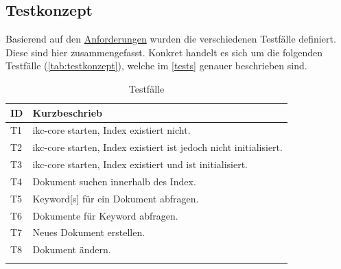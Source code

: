 \subsection{Testkonzept}
Basierend auf den \hyperref[anforderungen]{Anforderungen} wurden die verschiedenen Testfälle definiert. Diese sind hier zusammengefasst. Konkret handelt es sich um die folgenden Testfälle (\autoref{tab:testkonzept}), welche im \autoref{tests} genauer beschrieben sind.

\begin{longtable}{|p{1cm} | P{6cm} |}
  \hline
    ID & Kurzbeschrieb \\\hline
    T1 & \gls{ikc-core} starten, Index existiert nicht.\\\hline
    T2 & \gls{ikc-core} starten, Index existiert ist jedoch nicht initialisiert.\\\hline
    T3 & \gls{ikc-core} starten, Index existiert und ist initialisiert.\\\hline
    T4 & Dokument suchen innerhalb des Index.\\\hline
    T5 & \gls{Keyword}[s] für ein Dokument abfragen.\\\hline
    T6 & Dokumente für \gls{Keyword} abfragen.\\\hline
    T7 & Neues Dokument erstellen.\\\hline
    T8 & Dokument ändern.\\\hline
    \caption{Testfälle}
  \label{tab:testkonzept}
\end{longtable}


